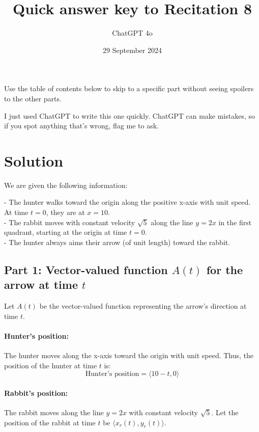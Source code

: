 \documentclass[11pt]{article}
\begin{document}
\title{Quick answer key to Recitation 8}
\author{ChatGPT 4o}
\date{29 September 2024}
\maketitle

Use the table of contents below to skip to a specific part
without seeing spoilers to the other parts.

I just used ChatGPT to write this one quickly.
ChatGPT can make mistakes, so if you spot anything that's wrong, flag me to ask.

\tableofcontents



\newpage

\section{Solution}

We are given the following information:

- The hunter walks toward the origin along the positive x-axis with unit speed. At time \( t = 0 \), they are at \( x = 10 \). \\
- The rabbit moves with constant velocity \( \sqrt{5} \) along the line \( y = 2x \) in the first quadrant, starting at the origin at time \( t = 0 \). \\
- The hunter always aims their arrow (of unit length) toward the rabbit.

\subsection{Part 1: Vector-valued function \( A(t) \) for the arrow at time \( t \)}

Let \( A(t) \) be the vector-valued function representing the arrow's direction at time \( t \).

\paragraph{Hunter's position:}
The hunter moves along the x-axis toward the origin with unit speed. Thus, the position of the hunter at time \( t \) is:
\[
\text{Hunter's position} = \langle 10 - t, 0 \rangle
\]

\paragraph{Rabbit's position:}
The rabbit moves along the line \( y = 2x \) with constant velocity \( \sqrt{5} \). Let the position of the rabbit at time \( t \) be \( \langle x_r(t), y_r(t) \rangle \).
\end{document}

